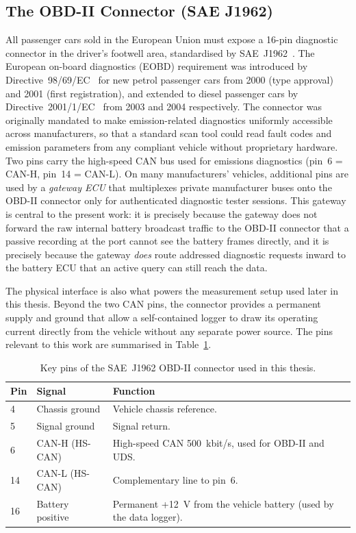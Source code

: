 \documentclass[11pt,a4paper,oneside,parskip=half]{scrreprt}
\begin{document}
\subsection{The OBD-II Connector (SAE J1962)}
All passenger cars sold in the European Union must expose a 16-pin diagnostic connector in the driver's footwell area, standardised by SAE~J1962~\cite{saej1962}. The European on-board diagnostics (EOBD) requirement was introduced by Directive~98/69/EC~\cite{eudir9869} for new petrol passenger cars from 2000 (type approval) and 2001 (first registration), and extended to diesel passenger cars by Directive~2001/1/EC~\cite{eudir20011} from 2003 and 2004 respectively. The connector was originally mandated to make emission-related diagnostics uniformly accessible across manufacturers, so that a standard scan tool could read fault codes and emission parameters from any compliant vehicle without proprietary hardware. Two pins carry the high-speed CAN bus used for emissions diagnostics (pin~6 = CAN-H, pin~14 = CAN-L). On many manufacturers' vehicles, additional pins are used by a \textit{gateway ECU} that multiplexes private manufacturer buses onto the OBD-II connector only for authenticated diagnostic tester sessions. This gateway is central to the present work: it is precisely because the gateway does not forward the raw internal battery broadcast traffic to the OBD-II connector that a passive recording at the port cannot see the battery frames directly, and it is precisely because the gateway \emph{does} route addressed diagnostic requests inward to the battery ECU that an active query can still reach the data.

The physical interface is also what powers the measurement setup used later in this thesis. Beyond the two CAN pins, the connector provides a permanent supply and ground that allow a self-contained logger to draw its operating current directly from the vehicle without any separate power source. The pins relevant to this work are summarised in Table~\ref{tab:obd2_pins}.

\begin{table}[H]
\caption{Key pins of the SAE~J1962 OBD-II connector used in this thesis.}
\label{tab:obd2_pins}
\centering
\begin{tabular}{llp{7cm}}
\toprule
\textbf{Pin} & \textbf{Signal} & \textbf{Function} \\
\midrule
4  & Chassis ground           & Vehicle chassis reference. \\
5  & Signal ground            & Signal return. \\
6  & CAN-H (HS-CAN)           & High-speed CAN 500~kbit/s, used for OBD-II and UDS. \\
14 & CAN-L (HS-CAN)           & Complementary line to pin~6. \\
16 & Battery positive         & Permanent +12~V from the vehicle battery (used by the data logger). \\
\bottomrule
\end{tabular}
\end{table}
\end{document}
